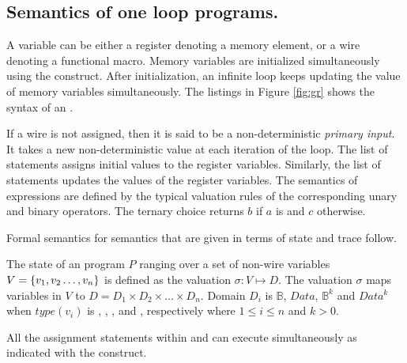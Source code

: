 %
\subsection{Semantics of one loop programs.}
%


A variable can be either a register
denoting a memory element, 
or a wire denoting a functional macro. 
Memory variables are initialized simultaneously using the 
 construct. 
After initialization, an infinite loop keeps updating the 
value of memory variables simultaneously. 
The listings in Figure \ref{fig:gr} shows the syntax of 
an \caig. 



If a wire is not assigned, then it is said to be a 
non-deterministic {\em primary input}. 
It takes a new non-deterministic value at each iteration of 
the loop.
The list of statements  assigns initial values to 
the register variables.
Similarly, the  list of statements updates 
the values of the register variables. 
The semantics of \caig expressions are defined by the typical 
valuation rules of the corresponding unary and binary operators. 
The ternary choice  returns $b$ if $a$ 
is \true and $c$ otherwise. 



Formal semantics for \caig semantics that are given 
in terms of \caig state and trace follow. 



\begin{definition}
The state of an \caig program $P$ ranging over a set of 
non-wire variables $V=\{ v_1,v_2\ldots,v_n \}$ is defined as 
the valuation 
$\sigma: V \mapsto D$. 
The valuation $\sigma$ maps variables in 
$V$ to $D=D_1\times D_2 \times \ldots \times D_n$. 
Domain $D_i$ is $\mathbb{B}$, $Data$,
$\mathbb{B}^k$ and $Data^k$ 
when 
$\mathit{type}(v_i)$ is , , 
, and , respectively 
where $1 \le i \le n$ and $k >0$.
\end{definition}



\begin{definition}
All the assignment statements within  and 
 can execute
simultaneously as indicated with the  
construct.
\end{definition}



